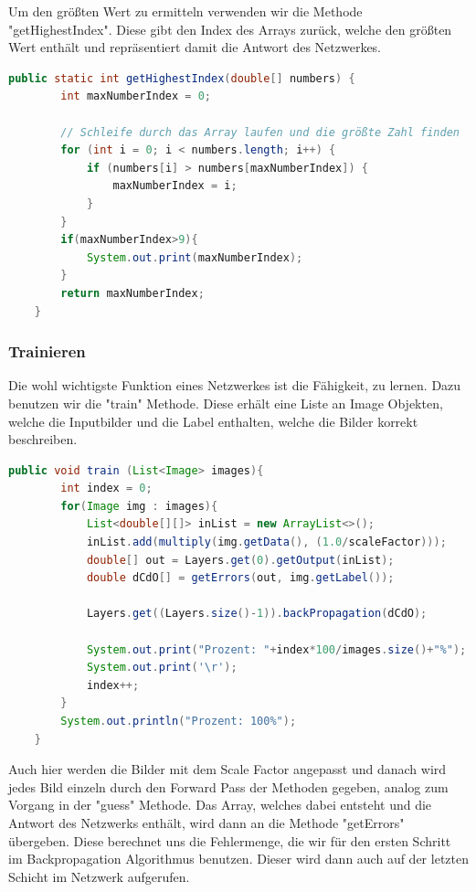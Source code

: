 \documentclass[12pt]{article}
\begin{document}
Um den größten Wert zu ermitteln verwenden wir die Methode "getHighestIndex". Diese gibt den Index des Arrays zurück, welche den größten Wert enthält und repräsentiert damit die Antwort des Netzwerkes.
\begin{lstlisting}[language=Java]
    public static int getHighestIndex(double[] numbers) {
        int maxNumberIndex = 0;

        // Schleife durch das Array laufen und die größte Zahl finden
        for (int i = 0; i < numbers.length; i++) {
            if (numbers[i] > numbers[maxNumberIndex]) {
                maxNumberIndex = i;
            }
        }
        if(maxNumberIndex>9){
            System.out.print(maxNumberIndex);
        }
        return maxNumberIndex;
    }
\end{lstlisting}

\subsubsection{Trainieren}

Die wohl wichtigste Funktion eines Netzwerkes ist die Fähigkeit, zu lernen. Dazu benutzen wir die "train" Methode. Diese erhält eine Liste an Image Objekten, welche die Inputbilder und die Label enthalten, welche die Bilder korrekt beschreiben.
\begin{lstlisting}[language=Java]
public void train (List<Image> images){
        int index = 0;
        for(Image img : images){
            List<double[][]> inList = new ArrayList<>();
            inList.add(multiply(img.getData(), (1.0/scaleFactor)));
            double[] out = Layers.get(0).getOutput(inList);
            double dCdO[] = getErrors(out, img.getLabel());

            Layers.get((Layers.size()-1)).backPropagation(dCdO);

            System.out.print("Prozent: "+index*100/images.size()+"%");
            System.out.print('\r');
            index++;
        }
        System.out.println("Prozent: 100%");
    }
\end{lstlisting}
Auch hier werden die Bilder mit dem Scale Factor angepasst und danach wird jedes Bild einzeln durch den Forward Pass der Methoden gegeben, analog zum Vorgang in der "guess" Methode. Das Array, welches dabei entsteht und die Antwort des Netzwerks enthält, wird dann an die Methode "getErrors" übergeben. Diese berechnet uns die Fehlermenge, die wir für den ersten Schritt im Backpropagation Algorithmus benutzen. Dieser wird dann auch auf der letzten Schicht im Netzwerk aufgerufen.
\end{document}
